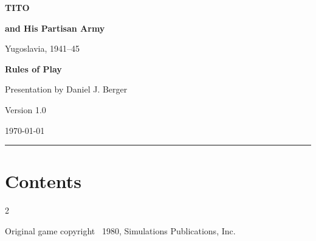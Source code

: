 \documentclass[11pt,letterpaper]{article}
\makeatletter
\newcommand{\compacttoc}{\@starttoc{toc}}
\makeatother
\begin{document}
\begin{titlepage}
  \thispagestyle{empty}
  \vspace*{-0.2in}
  \noindent
  \begin{minipage}[t]{0.69\textwidth}
    {\sffamily\bfseries\fontsize{46}{46}\selectfont\color{TitoGreen}TITO\par}
    \vspace{0.18em}
    {\sffamily\bfseries\fontsize{21}{24}\selectfont\color{TitoRed}
      and His Partisan Army\par}
    {\sffamily\fontsize{15}{18}\selectfont Yugoslavia, 1941--45\par}
  \end{minipage}\hfill
  \begin{minipage}[t]{0.27\textwidth}
    \raggedleft\vspace{0pt}
    {\sffamily\bfseries\large Rules of Play\par}
    \vspace{0.25em}
    {\sffamily\small Presentation by Daniel J. Berger\par}
    {\sffamily\small Version 1.0\par}
    {\sffamily\small \today\par}
  \end{minipage}

  \vspace{0.55em}
  {\color{TitoGreen}\rule{\textwidth}{1.5pt}}
  \vspace{-0.45em}

  \section*{Contents}
  \vspace{-0.35em}
  \begingroup
    \footnotesize
    \setlength{\parskip}{0pt}
    \setlength{\columnsep}{0.32in}
    \setlength{\columnseprule}{0.25pt}
    \setlength{\cftbeforesecskip}{2.2pt}
    \setlength{\cftsecindent}{0pt}
    \setlength{\cftsecnumwidth}{1.8em}
    \setlength{\cftsubsecindent}{1.15em}
    \setlength{\cftsubsecnumwidth}{2.6em}
    \renewcommand{\cftsecfont}{\sffamily\bfseries}
    \renewcommand{\cftsecpagefont}{\sffamily\bfseries}
    \renewcommand{\cftsubsecfont}{\sffamily}
    \renewcommand{\cftsubsecpagefont}{\sffamily}
    \renewcommand{\cftdotsep}{2}
    \renewcommand{\cftsecafterpnum}{\nopagebreak[4]}
    \raggedcolumns
    \begin{multicols}{2}
      \compacttoc
    \end{multicols}
  \endgroup

  \vfill
  {\sffamily\scriptsize Original game copyright \textcopyright\ 1980,
    Simulations Publications, Inc.\par}
\end{titlepage}
\end{document}
